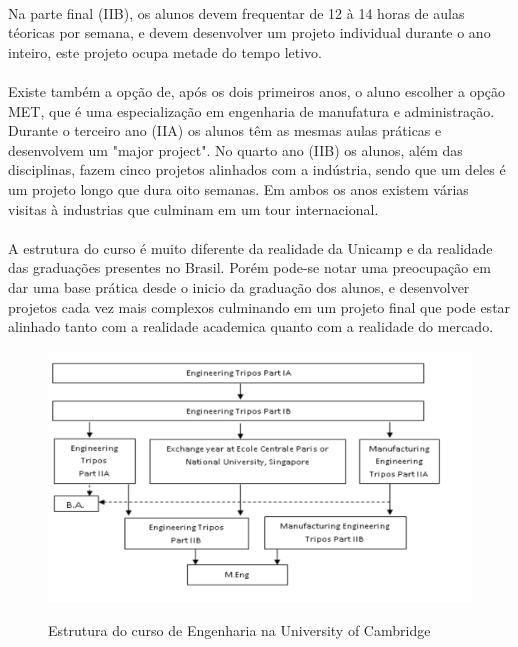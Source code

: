 \documentclass[12pt]{article} %
\begin{document}
\paragraph{} Na parte final (IIB), os alunos devem frequentar de 12 à 14 horas de aulas téoricas por semana, e devem desenvolver um projeto individual durante o ano inteiro, este projeto ocupa metade do tempo letivo.

\paragraph{} Existe também a opção de, após os dois primeiros anos, o aluno escolher a opção MET, que é uma especialização em engenharia de manufatura e administração. Durante o terceiro ano (IIA) os alunos têm as mesmas aulas práticas e desenvolvem um "major project". No quarto ano (IIB) os alunos, além das disciplinas, fazem cinco projetos alinhados com a indústria, sendo que um deles é um projeto longo que dura oito semanas. Em ambos os anos existem várias visitas à industrias que culminam em um tour internacional.

\paragraph{} A estrutura do curso é muito diferente da realidade da Unicamp e da realidade das graduações presentes no Brasil. Porém pode-se notar uma preocupação em dar uma base prática desde o inicio da graduação dos alunos, e desenvolver projetos cada vez mais complexos culminando em um projeto final que pode estar alinhado tanto com a realidade academica quanto com a realidade do mercado. 

\begin{figure}[H]
\centering
\includegraphics[scale=0.2]{pictures/gradeCambridge.png}\\
\caption{Estrutura do curso de Engenharia na University of Cambridge}
\end{figure}
\end{document}
